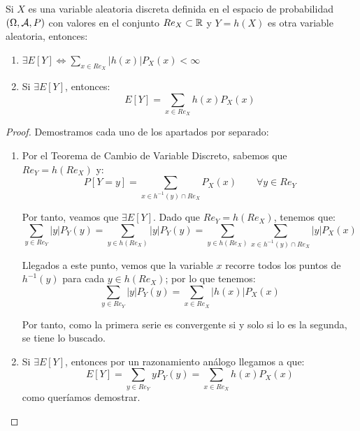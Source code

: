 \begin{teo}
    Si $X$ es una variable aleatoria discreta definida en el espacio de probabilidad $(\Omega, \mathcal{A}, P)$ con valores en el conjunto $Re_X \subset \mathbb R$ y $Y=h(X)$ es otra variable aleatoria, entonces:
    \begin{enumerate}
        \item $\displaystyle \exists E[Y]\Longleftrightarrow \sum_{x\in Re_X} |h(x)|P_X(x) < \infty$
        \item Si $\displaystyle \exists E[Y]$, entonces:
        \begin{equation*}
            E[Y] = \sum_{x\in Re_X} h(x)P_X(x)
        \end{equation*}
    \end{enumerate}
\end{teo}
\begin{proof}
    Demostramos cada uno de los apartados por separado:
    \begin{enumerate}
        \item Por el Teorema de Cambio de Variable Discreto, sabemos que $Re_Y = h(Re_X)$ y:
        \begin{equation*}
            P[Y=y] = \sum_{{x\in h^{-1}(y)\cap Re_X}} P_X(x) \qquad \forall y\in Re_Y
        \end{equation*}

        Por tanto, veamos que $\exists E[Y]$. Dado que $Re_Y = h(Re_X)$, tenemos que:
        \begin{equation*}
            \sum_{y\in Re_Y} |y|P_Y(y) = \sum_{y\in h(Re_X)} |y|P_Y(y) = \sum_{y\in h(Re_X)} \sum_{{x\in h^{-1}(y)\cap Re_X}} |y|P_X(x)
        \end{equation*}

        Llegados a este punto, vemos que la variable $x$ recorre todos los puntos de $h^{-1}(y)$ para cada $y\in h(Re_X)$; por lo que tenemos:
        \begin{equation*}
            \sum_{y\in Re_Y} |y|P_Y(y) = \sum_{x\in Re_X} |h(x)|P_X(x)
        \end{equation*}

        Por tanto, como la primera serie es convergente si y solo si lo es la segunda, se tiene lo buscado.

        \item Si $\exists E[Y]$, entonces por un razonamiento análogo llegamos a que:
        \begin{equation*}
            E[Y] = \sum_{y\in Re_Y} yP_Y(y) = \sum_{x\in Re_X} h(x)P_X(x)
        \end{equation*}
        como queríamos demostrar.
    \end{enumerate}
\end{proof}

